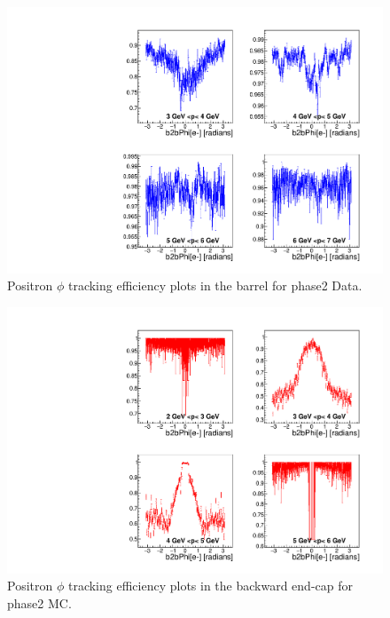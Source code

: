 \documentclass[a4paper,11pt,twosided,final,german,openbib,pdftex,listof=totoc,bibliography=totoc]{scrbook}
\begin{document}
\begin{appendix}
\begin{figure}[!htbp]
	\centering
	\includegraphics[width=\textwidth]{Plots/master/xPMPhiepBarrel_Data}
	\caption[Momentum $\phi$ Positron Barrel Efficiency Phase2 Data]{Positron $\phi$ tracking efficiency plots in the barrel for phase2 Data.}
	\label{plt:PMPhiepBarrel_Data}
\end{figure}









\begin{figure}[!htbp]
	\centering
	\includegraphics[width=\textwidth]{Plots/master/xPMPhiepEC_MC}
	\caption[Momentum $\phi$ Positron Backward End-Cap Efficiency Phase2 MC]{Positron $\phi$ tracking efficiency plots in the backward end-cap for phase2 MC.}
	\label{plt:PMPhiepEC_MC}
\end{figure}



\end{appendix}
\end{document}
